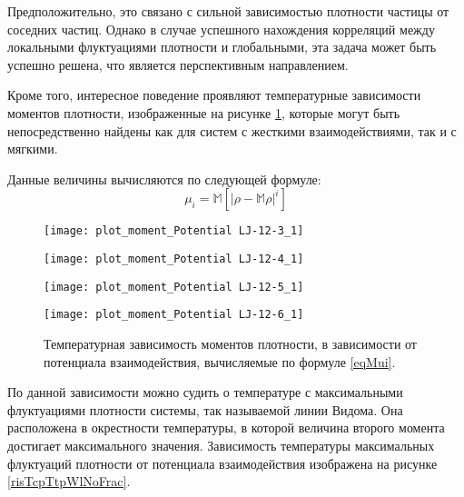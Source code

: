 Предположительно, это связано с сильной зависимостью плотности частицы от соседних частиц. Однако в случае успешного нахождения корреляций между локальными флуктуациями плотности и глобальными, эта задача может быть успешно решена, что является перспективным направлением.  

Кроме того, интересное поведение проявляют температурные зависимости моментов плотности, изображенные на рисунке \ref{risMu}, которые могут быть непосредственно найдены как для систем с жесткими взаимодействиями, так и с мягкими. 

Данные величины вычисляются по следующей формуле:
\begin{equation}
\mu_i = \mathbb{M} \left[ |\rho - \mathbb{M} \rho|^i \right]
\label{eqMui}
\end{equation}

\begin{figure}[h]
\begin{center}
\begin{minipage}[h]{0.45\linewidth}
\texttt{[image: plot\_moment\_Potential LJ-12-3\_1]}
\end{minipage}
\begin{minipage}[h]{0.45\linewidth}
\texttt{[image: plot\_moment\_Potential LJ-12-4\_1]}
\end{minipage}


\begin{minipage}[h]{0.45\linewidth}
\texttt{[image: plot\_moment\_Potential LJ-12-5\_1]}
\end{minipage}
\begin{minipage}[h]{0.45\linewidth}
\texttt{[image: plot\_moment\_Potential LJ-12-6\_1]}
\end{minipage}
\caption{Температурная зависимость моментов плотности, в зависимости от потенциала взаимодействия, вычисляемые по формуле \ref{eqMui}.}
\label{risMu}
\end{center}
\end{figure}

По данной зависимости можно судить о температуре с максимальными флуктуациями плотности системы, так называемой линии Видома. Она расположена в окрестности температуры, в которой величина второго момента достигает максимального значения. Зависимость температуры максимальных флуктуаций плотности от потенциала взаимодействия изображена на рисунке \ref{risTcpTtpWlNoFrac}. 

